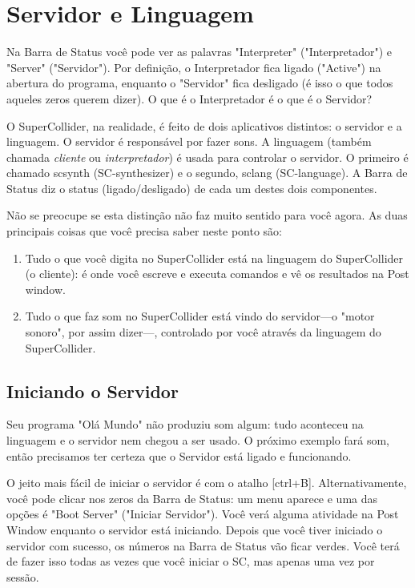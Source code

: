 \section{Servidor e Linguagem}

Na Barra de Status você pode ver as palavras "Interpreter" ("Interpretador") e "Server" ("Servidor"). Por definição, o Interpretador fica ligado ("Active") na abertura do programa, enquanto o "Servidor" fica desligado (é isso o que todos aqueles zeros querem dizer). O que é o Interpretador é o que é o Servidor?

O SuperCollider, na realidade, é feito de dois aplicativos distintos: o servidor e a linguagem. O servidor é responsável por fazer sons. A linguagem (também chamada \emph{cliente} ou \emph{interpretador}) é usada para controlar o servidor. O primeiro é chamado scsynth (SC-synthesizer) e o segundo, sclang (SC-language). A Barra de Status diz o status (ligado/desligado) de cada um destes dois componentes.

Não se preocupe se esta distinção não faz muito sentido para você agora. As duas principais coisas que você precisa saber neste ponto são:

\begin{enumerate}
\item Tudo o que você digita no SuperCollider está na linguagem do SuperCollider (o cliente): é onde você escreve e executa comandos e vê os resultados na Post window.
\item Tudo o que faz som no SuperCollider está vindo do servidor---o "motor sonoro", por assim dizer---, controlado por você através da linguagem do SuperCollider.
\end{enumerate}

\subsection{Iniciando o Servidor}
Seu programa "Olá Mundo" não produziu som algum: tudo aconteceu na linguagem e o servidor nem chegou a ser usado. O próximo exemplo fará som, então precisamos ter certeza que o Servidor está ligado e funcionando.

O jeito mais fácil de iniciar o servidor é com o atalho [ctrl+B]. Alternativamente, você pode clicar nos zeros da Barra de Status: um menu aparece e uma das opções é "Boot Server" ("Iniciar Servidor"). Você verá alguma atividade na Post Window enquanto o servidor está iniciando. Depois que você tiver iniciado o servidor com sucesso, os números na Barra de Status vão ficar verdes. Você terá de fazer isso todas as vezes que você iniciar o SC, mas apenas uma vez por sessão.


